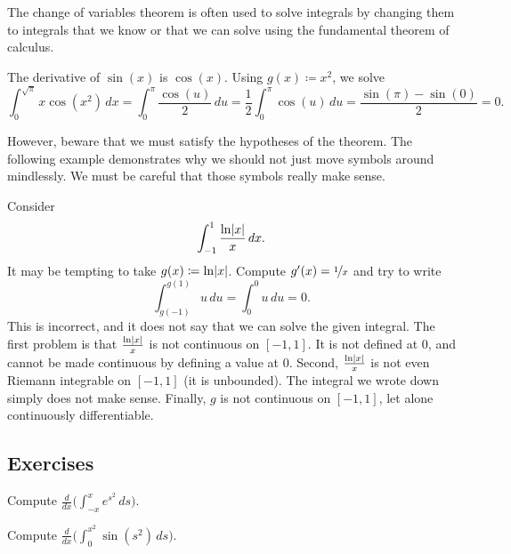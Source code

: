 The change of variables theorem is often used to solve integrals by changing them
to integrals that we know or that we can solve using the fundamental theorem of
calculus.

\begin{example}
The derivative of $\sin(x)$ is $\cos(x)$.
Using $g(x) \coloneqq x^2$, we solve
\begin{equation*}
\int_0^{\sqrt{\pi}} x \cos(x^2) \, dx = \int_0^\pi \frac{\cos(u)}{2} \, du
=
\frac{1}{2}
\int_0^\pi \cos(u) \, du
=
\frac{
\sin(\pi) - \sin(0)
}{2}
=
0 .
\end{equation*}
\end{example}

However, beware that we must satisfy the hypotheses of the theorem.  The
following example demonstrates why we should not just 
move symbols around mindlessly.
We must be careful that those symbols really make sense.

\begin{example}
Consider
\begin{equation*}
\int_{-1}^{1} \frac{\ln \lvert {x} \rvert}{x} \,dx .
\end{equation*}
It may be tempting to take $g(x) \coloneqq \ln \lvert {x} \rvert$.  Compute $g'(x) =
\nicefrac{1}{x}$ and try to write
\begin{equation*}
\int_{g(-1)}^{g(1)} u \,du = 
\int_{0}^{0} u \,du = 0. 
\end{equation*}
This  is incorrect, and it does not say
that we can solve the given integral.  The first problem is that
$\frac{\ln \lvert {x} \rvert}{x}$ is not continuous on $[-1,1]$.
It is not defined at 0, and cannot be made continuous by defining a value at
0.
Second, $\frac{\ln \lvert {x} \rvert}{x}$ is not even Riemann integrable on $[-1,1]$
(it is unbounded).
The integral we wrote down simply does not make sense.
Finally, $g$ is not continuous 
on $[-1,1]$, let alone continuously differentiable.
\end{example}

\subsection{Exercises}

\begin{exercise}
Compute
$\displaystyle
\frac{d}{dx} \biggl( \int_{-x}^x e^{s^2}\,ds \biggr)$.
\end{exercise}

\begin{exercise}
Compute
$\displaystyle
\frac{d}{dx} \biggl( \int_{0}^{x^2} \sin(s^2)\,ds \biggr)$.
\end{exercise}

